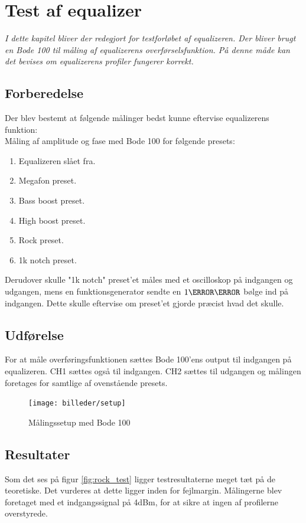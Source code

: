 \chapter{Test af equalizer}\label{sec:test_eq}

\emph{I dette kapitel bliver der redegjort for testforløbet af equalizeren. Der bliver brugt en Bode 100 til måling af equalizerens overførselsfunktion. På denne måde kan det bevises om equalizerens profiler fungerer korrekt.}

\section{Forberedelse}
Der blev bestemt at følgende målinger bedst kunne eftervise equalizerens funktion: \\

Måling af amplitude og fase med Bode 100 for følgende presets:
\begin{enumerate}
    \item Equalizeren slået fra.
    \item Megafon preset.
    \item Bass boost preset.
    \item High boost preset.
    \item Rock preset. 
    \item 1k notch preset. \\
\end{enumerate}


Derudover skulle "1k notch" preset'et måles med et oscilloskop på indgangen og udgangen, mens en funktionsgenerator sendte en $1\kilo\hertz$ bølge ind på indgangen. Dette skulle eftervise om preset'et gjorde præcist hvad det skulle. \\

\section{Udførelse}
For at måle overføringsfunktionen sættes Bode 100'ens output til indgangen på equalizeren. CH1 sættes også til indgangen. CH2 sættes til udgangen og målingen foretages for samtlige af ovenstående presets. 

\begin{figure}[h!]
	\centering
	\texttt{[image: billeder/setup]}
	\caption{Målingssetup med Bode 100}
	\label{fig:bode100}
\end{figure}

\section{Resultater}
Som det ses på figur \ref{fig:rock_test} ligger testresultaterne meget tæt på de teoretiske. Det vurderes at dette ligger inden for fejlmargin. Målingerne blev foretaget med et indgangssignal på 4dBm, for at sikre at ingen af profilerne overstyrede.


